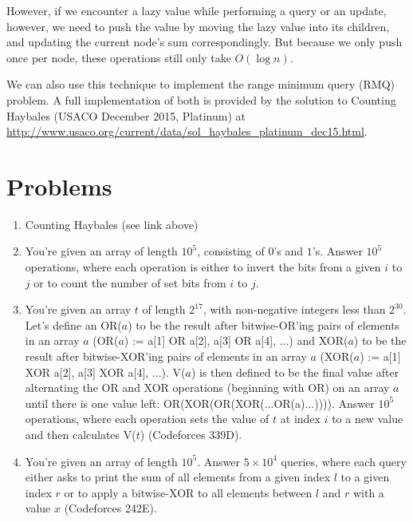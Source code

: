 \documentclass[11pt]{article}
\begin{document}
However, if we encounter a lazy value while performing a query or an update, however, we need to push the value by moving the lazy value into its children, and updating the current node's sum correspondingly. But because we only push once per node, these operations still only take $O(\log n)$.

We can also use this technique to implement the range minimum query (RMQ) problem. A full implementation of both is provided by the solution to Counting Haybales (USACO December 2015, Platinum) at \url{http://www.usaco.org/current/data/sol_haybales_platinum_dec15.html}.

\section{Problems}
\begin{enumerate}
    \item Counting Haybales (see link above)
    \item You're given an array of length $10^5$, consisting of $0$'s and $1$'s. Answer $10^5$ operations, where each operation is either to invert the bits from a given $i$ to $j$ or to count the number of set bits from $i$ to $j$.
    \item You're given an array $t$ of length $2^{17}$, with non-negative integers less than $2^{30}$. Let's define an OR($a$) to be the result after bitwise-OR'ing pairs of elements in an array $a$ (OR($a$) := {a[1] OR a[2], a[3] OR a[4], ...}) and XOR($a$) to be the result after bitwise-XOR'ing pairs of elements in an array $a$ (XOR($a$) := {a[1] XOR a[2], a[3] XOR a[4], ...}). V($a$) is then defined to be the final value after alternating the OR and XOR operations (beginning with OR) on an array $a$ until there is one value left: OR(XOR(OR(XOR(...OR(a)...)))). Answer $10^5$ operations, where each operation sets the value of $t$ at index $i$ to a new value and then calculates V($t$) (Codeforces 339D).
    \item You're given an array of length $10^5$. Answer $5 \times 10^4$ queries, where each query either asks to print the sum of all elements from a given index $l$ to a given index $r$ or to apply a bitwise-XOR to all elements between $l$ and $r$ with a value $x$ (Codeforces 242E).
\end{enumerate}
\end{document}
